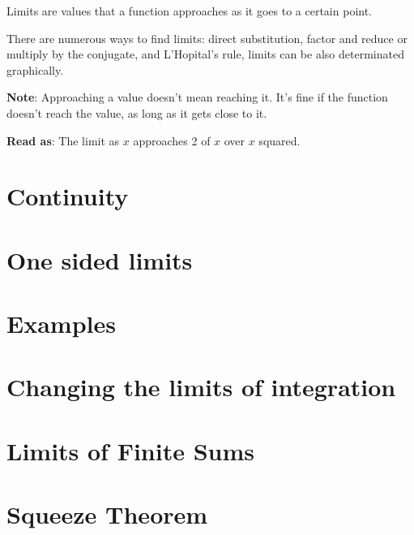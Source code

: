 Limits are values that a function approaches as it goes to a certain point. 

There are numerous ways to find limits: direct substitution, factor and reduce or multiply by the conjugate, and L'Hopital's rule, limits can be also determinated graphically.

\textbf{Note}: Approaching a value doesn't mean reaching it. It's fine if the function doesn't reach the value, as long as it gets close to it.

\textbf{Read as}: The limit as \( x \) approaches 2 of \( x \) over \( x \) squared.

\section{Continuity}

\section{One sided limits}

\section{Examples}


\section{Changing the limits of integration}
\section{Limits of Finite Sums}


\section{Squeeze Theorem}